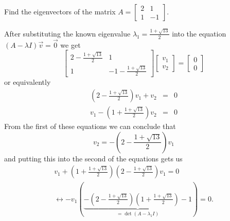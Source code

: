 \documentclass[../book.tex]{subfiles}
\begin{document}
\begin{example} \label{eg:eigen2}
Find the eigenvectors of the matrix \(A = \begin{bmatrix}2 & 1 \\ 1 & -1\end{bmatrix}\).
\end{example}

\begin{solution}
After substituting the known eigenvalue \(\lambda_1 = \frac{1+\sqrt{13}}{2}\) into the equation \((A- \lambda I) \vec{v} = \vec{0}\) we get
\begin{equation}\label{eq:eig-11}
\begin{bmatrix}
  2 - \frac{1+\sqrt{13}}{2} & 1 \\
  1 & -1 - \frac{1+\sqrt{13}}{2}
\end{bmatrix}
\begin{bmatrix}
  v_1 \\ v_2
\end{bmatrix}
=
\begin{bmatrix}
  0 \\ 0
\end{bmatrix}
\end{equation}
or equivalently
\begin{equation}\label{eq:eig-12}
\begin{array}{lcl}
  (2 - \frac{1+\sqrt{13}}{2})  v_1 + v_2 &=& 0\\
  v_1 - (1+\frac{1+\sqrt{13}}{2}) v_2 &=& 0
\end{array}
\end{equation}
From the first of these equations we can conclude that
\begin{equation} \label{eq:key}
  v_2 = - \left(2 - \frac{1+\sqrt{13}}{2}\right) v_1
\end{equation}
and putting this into the second of the equations gets us
\begin{equation}\label{eq:eig-13}
\begin{aligned}
  v_1 + \left(1+\frac{1+\sqrt{13}}{2}\right)
  \left(2 - \frac{1+\sqrt{13}}{2}\right) v_1 = 0
  \\
  \leftrightarrow
  -v_1  \left(
    \underbrace{
      -\left(2 - \frac{1+\sqrt{13}}{2}\right)
    \left(1+\frac{1+\sqrt{13}}{2}\right) - 1}_{=\det (A - \lambda_1  I)}
  \right) = 0.
\end{aligned}
\end{equation}


\end{solution}
\end{document}

